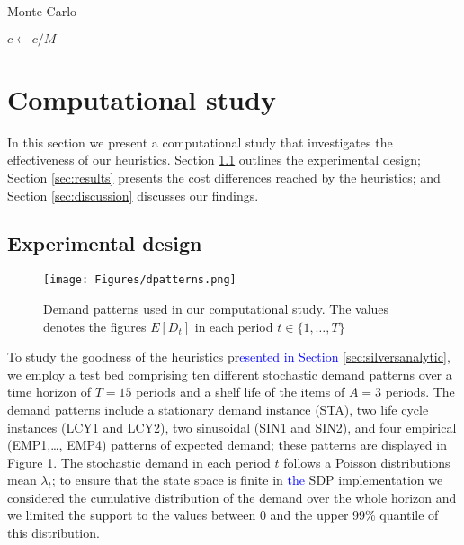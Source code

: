 \documentclass{tPRS2e}
\newcommand{\blue}{\textcolor{blue}}
\begin{document}
\begin{algorithm}[h]
	\caption{Monte-Carlo}
	\label{alg:Monte-Carlo}
		\medskip
		$c \leftarrow c/M$\;
\end{algorithm}

\section{Computational study}
\label{sec:computationalstudy}

In this section we present a computational study that investigates the effectiveness of our heuristics. Section \ref{sec:design} outlines the experimental design; Section \ref{sec:results} presents the cost differences reached by the heuristics; and Section \ref{sec:discussion} discusses our findings. 

\subsection{Experimental design}
\label{sec:design}
\begin{figure}[htb]
\centering
\texttt{[image: Figures/dpatterns.png]}
\caption{Demand patterns used in our computational study. The values denotes the figures $E[D_t]$ in each period $t \in \{1,\ldots,T\}$}
\label{fig:instances}
\end{figure}
To study the goodness of the heuristics pr\blue{esented in Section} \ref{sec:silversanalytic},  we employ a test bed comprising ten different stochastic demand patterns over a time horizon of $T=15$ periods and a shelf life of the items of $A=3$ periods. The demand patterns include a stationary demand instance (STA), two life cycle instances (LCY1 and LCY2), two sinusoidal (SIN1 and SIN2), and four empirical (EMP1,\ldots, EMP4) patterns of expected demand; these patterns are displayed in Figure \ref{fig:instances}. The stochastic demand in each period $t$ follows a Poisson distributions mean $\lambda_t$; to ensure that the state space is finite in \blue{the} SDP implementation we
considered the cumulative distribution of the demand over the whole horizon and we limited the support to the values between 0 and the upper 99\% quantile of this distribution. 
\end{document}
